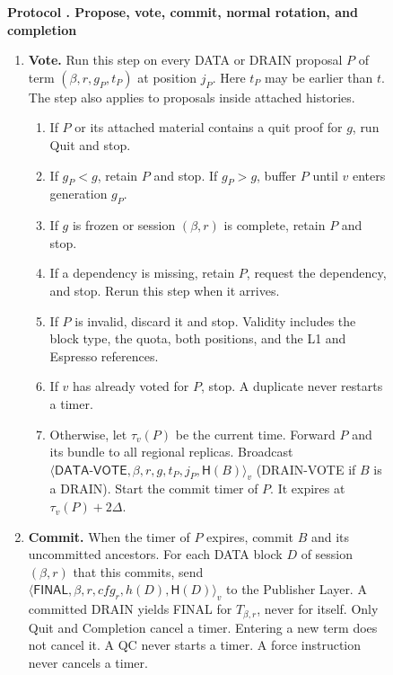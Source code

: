 \documentclass[11pt,a4paper]{article}
\newcommand{\RR}[1]{{\color{rrRed}#1}}
\newcommand{\Hash}{\mathsf H}
\newcommand{\tagg}[1]{\ensuremath{\mathsf{#1}}}
\newcounter{protocol}
\newenvironment{protocol}[3][htbp]{\begin{figure}[#1]\refstepcounter{protocol}\label{#2}
\begin{mdframed}[linewidth=.6pt,skipabove=0pt,skipbelow=0pt,
innertopmargin=7pt,innerbottommargin=7pt]\small
\textbf{Protocol \theprotocol. #3}\par\smallskip}{\end{mdframed}\end{figure}}
\begin{document}
\begin{protocol}{alg:steady}{Propose, vote, commit, normal rotation\RR{, and completion}}
\begin{enumerate}[label=\textbf{\arabic*)},itemsep=3pt]
\item \textbf{Vote.} Run this step on every DATA \RR{or DRAIN} proposal
$P$ of term $(\beta,r,g_P,t_P)$ at position $j_P$. Here $t_P$ may be earlier
than $t$. The step also applies to proposals inside attached histories.
 \begin{enumerate}[label=(\alph*)]
 \item If $P$ or its attached material contains a quit proof for $g$,
       run Quit and stop.
 \item If $g_P<g$, retain $P$ and stop. If $g_P>g$, buffer $P$
       until $v$ enters generation $g_P$.
 \item If $g$ is frozen \RR{or session $(\beta,r)$ is complete}, retain $P$ and
       stop.
 \item If a dependency is missing, retain $P$, request the dependency,
       and stop. Rerun this step when it arrives.
 \item If $P$ is invalid, discard it and stop. \RR{Validity includes the
       block type, the quota, both positions, and the L1 and Espresso references.}
 \item If $v$ has already voted for $P$, stop.
       A duplicate never restarts a timer.
 \item Otherwise, let $\tau_v(P)$ be the current time. Forward $P$ and
       its bundle to all \RR{regional replicas. }
       Broadcast
       $\langle\tagg{DATA\mbox{-}VOTE},\beta,r,g,t_P,j_P,\Hash(B)\rangle_v$
       \RR{(DRAIN-VOTE if $B$ is a DRAIN)}.
       Start the commit timer of $P$. It expires at $\tau_v(P)+2\Delta$.
 \end{enumerate}

\item \textbf{Commit.} When the timer of $P$ expires, commit $B$ and
its uncommitted ancestors. \RR{For each DATA block $D$ of session $(\beta,r)$
that this commits, send
$\langle\tagg{FINAL},\beta,r,\mathit{cfg}_r,h(D),\Hash(D)\rangle_v$ to the Publisher Layer. A committed DRAIN yields FINAL for $T_{\beta,r}$, never for
itself. } Only Quit \RR{and Completion} cancel a timer. Entering a
new term does not cancel it. A QC never starts a timer. \RR{A force
instruction never cancels a timer.}


\end{enumerate}
\end{protocol}
\end{document}
